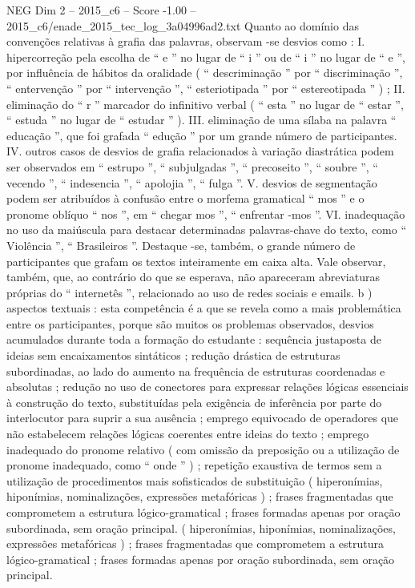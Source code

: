 \begin{textsample}{NEG Dim 2 – 2015\_c6 – Score -1.00 – 2015\_c6/enade\_2015\_tec\_log\_3a04996ad2.txt}
Quanto ao domínio das convenções relativas à grafia das palavras, observam -se desvios como : I. hipercorreção pela escolha de “ e ” no lugar de “ i ” ou de “ i ” no lugar de “ e ”, por influência de hábitos da oralidade ( “ descriminação ” por “ discriminação ”, “ entervenção ” por “ intervenção ”, “ esteriotipada ” por “ estereotipada ” ) ; II. eliminação do “ r ” marcador do infinitivo verbal ( “ esta ” no lugar de “ estar ”, “ estuda ” no lugar de “ estudar ” ).
III. eliminação de uma sílaba na palavra “ educação ”, que foi grafada “ edução ” por um grande número de participantes.
IV. outros casos de desvios de grafia relacionados à variação diastrática podem ser observados em “ estrupo ”, “ subjulgadas ”, “ precoseito ”, “ soubre ”, “ vecendo ”, “ indesencia ”, “ apolojia ”, “ fulga ”.
V. desvios de segmentação podem ser atribuídos à confusão entre o morfema gramatical “ mos ” e o pronome oblíquo “ nos ”, em “ chegar mos ”, “ enfrentar -mos ”.
VI. inadequação no uso da maiúscula para destacar determinadas palavras-chave do texto, como “ Violência ”, “ Brasileiros ”.
Destaque -se, também, o grande número de participantes que grafam os textos inteiramente em caixa alta.
Vale observar, também, que, ao contrário do que se esperava, não apareceram abreviaturas próprias do “ internetês ”, relacionado ao uso de redes sociais e emails. b ) aspectos textuais : esta competência é a que se revela como a mais problemática entre os participantes, porque são muitos os problemas observados, desvios acumulados durante toda a formação do estudante : sequência justaposta de ideias sem encaixamentos sintáticos ; redução drástica de estruturas subordinadas, ao lado do aumento na frequência de estruturas coordenadas e absolutas ; redução no uso de conectores para expressar relações lógicas essenciais à construção do texto, substituídas pela exigência de inferência por parte do interlocutor para suprir a sua ausência ; emprego equivocado de operadores que não estabelecem relações lógicas coerentes entre ideias do texto ; emprego inadequado do pronome relativo ( com omissão da preposição ou a utilização de pronome inadequado, como “ onde ” ) ; repetição exaustiva de termos sem a utilização de procedimentos mais sofisticados de substituição ( hiperonímias, hiponímias, nominalizações, expressões metafóricas ) ; frases fragmentadas que comprometem a estrutura lógico-gramatical ; frases formadas apenas por oração subordinada, sem oração principal. ( hiperonímias, hiponímias, nominalizações, expressões metafóricas ) ; frases fragmentadas que comprometem a estrutura lógico-gramatical ; frases formadas apenas por oração subordinada, sem oração principal.

\end{textsample}
